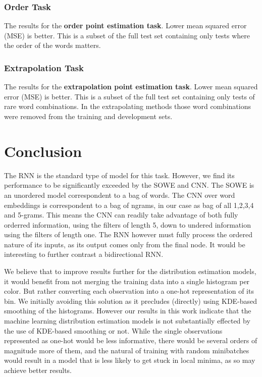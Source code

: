 \documentclass[11pt,a4paper]{article}
\begin{document}
\subsubsection{Order Task}

\begin{table}
	\caption{\label{tbl:pointord} The results for the \textbf{order point estimation task}. Lower mean squared error (MSE) is better. This is a subset of the full test set containing only tests where the order of the words matters.}
\end{table}

\subsubsection{Extrapolation Task}
\begin{table}
	\caption{\label{tbl:pointextrapo} The results for the \textbf{extrapolation point estimation task}. Lower mean squared error (MSE) is better. This is a subset of the full test set containing only tests of rare word combinations. In the extrapolating methods those word combinations were removed from the training and development sets.}
\end{table}




\section{Conclusion}

The RNN is the standard type of model for this task.
However, we find its performance to be significantly exceeded by the SOWE and CNN.
The SOWE is an unordered model correspondent to a bag of words.
The CNN over word embeddings is correspondent to a bag of ngrams, in our case as bag of all 1,2,3,4 and 5-grams.
This means the CNN can readily take advantage of both fully orderred information, using the filters of length 5, down to undered information using the filters of length one.
The RNN however must fully process the ordered nature of its inputs, as its output comes only from the final node.
It would be interesting to further contrast a bidirectional RNN.

We believe that to improve results further for the distribution estimation models,
it would benefit from not merging the training data into a single histogram per color.
But rather converting each observation into a one-hot representation of its bin.
We initially avoiding this solution as it precludes (directly) using KDE-based smoothing of the histograms.
However our results in this work indicate that the machine learning distribution estimation models is not substantially effected by the use of KDE-based smoothing or not.
While the single observations represented as one-hot would be less informative, there would be several orders of magnitude more of them, and the natural of training with random minibatches would result in a model that is less likely to get stuck in local minima, as so may achieve better results.


\clearpage


\clearpage
\appendix

\end{document}

